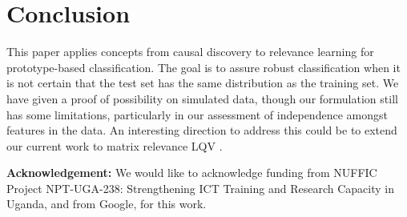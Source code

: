 \documentclass{esannV2}
\begin{document}

\section{Conclusion}
\label{sec:Conclusion}

This paper applies concepts from causal discovery to relevance learning for prototype-based classification. The goal is to assure robust classification when it is not certain that the test set has the same distribution as the training set.
We have given a proof of possibility on simulated data, though our formulation still has some limitations, particularly in our assessment of independence amongst features in the data. An interesting direction to address this could be to extend our current work to matrix relevance LQV \cite{09}.

\textbf{Acknowledgement:} We would like to acknowledge funding from NUFFIC Project NPT-UGA-238: Strengthening ICT Training and Research Capacity in Uganda, and from Google, for this work.


\begin{footnotesize}




\end{footnotesize}

\end{document}
